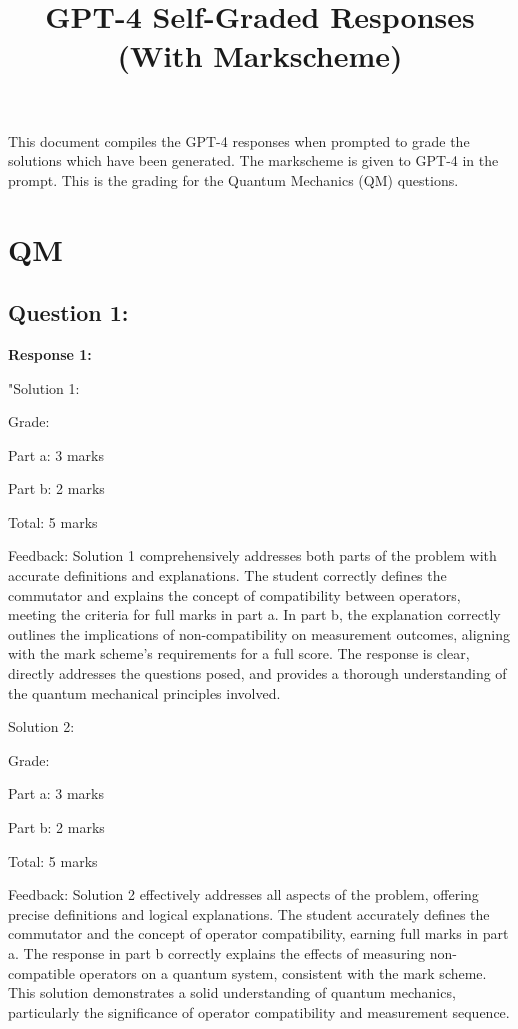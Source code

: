 \documentclass[a4paper,11pt]{article}
\begin{document}
\title{GPT-4 Self-Graded Responses (With Markscheme)}
\maketitle

This document compiles the GPT-4 responses when prompted to grade the solutions which have been generated. The markscheme is given to GPT-4 in the prompt. This is the grading for the Quantum Mechanics (QM) questions. 

\section{QM}

\subsection*{Question 1:}

\textbf{Response 1:}

"Solution 1:

Grade:

Part a: 3 marks

Part b: 2 marks

Total: 5 marks

Feedback:
Solution 1 comprehensively addresses both parts of the problem with accurate definitions and explanations. The student correctly defines the commutator and explains the concept of compatibility between operators, meeting the criteria for full marks in part a. In part b, the explanation correctly outlines the implications of non-compatibility on measurement outcomes, aligning with the mark scheme's requirements for a full score. The response is clear, directly addresses the questions posed, and provides a thorough understanding of the quantum mechanical principles involved.

Solution 2:

Grade:

Part a: 3 marks

Part b: 2 marks

Total: 5 marks

Feedback:
Solution 2 effectively addresses all aspects of the problem, offering precise definitions and logical explanations. The student accurately defines the commutator and the concept of operator compatibility, earning full marks in part a. The response in part b correctly explains the effects of measuring non-compatible operators on a quantum system, consistent with the mark scheme. This solution demonstrates a solid understanding of quantum mechanics, particularly the significance of operator compatibility and measurement sequence.
\end{document}
